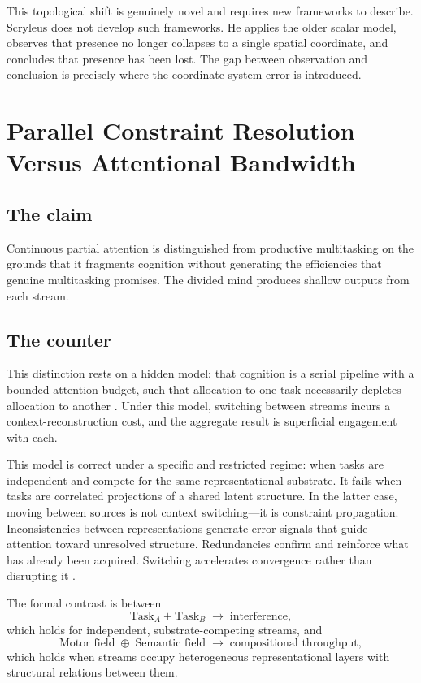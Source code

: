 \documentclass[12pt, a4paper]{article}
\begin{document}
This topological shift is genuinely novel and requires new frameworks to describe. Scryleus does not develop such frameworks. He applies the older scalar model, observes that presence no longer collapses to a single spatial coordinate, and concludes that presence has been lost. The gap between observation and conclusion is precisely where the coordinate-system error is introduced.

\section{Parallel Constraint Resolution Versus Attentional Bandwidth}

\subsection{The claim}
Continuous partial attention is distinguished from productive multitasking on the grounds that it fragments cognition without generating the efficiencies that genuine multitasking promises. The divided mind produces shallow outputs from each stream.

\subsection{The counter}
This distinction rests on a hidden model: that cognition is a serial pipeline with a bounded attention budget, such that allocation to one task necessarily depletes allocation to another \cite{Simon1969}. Under this model, switching between streams incurs a context-reconstruction cost, and the aggregate result is superficial engagement with each.

This model is correct under a specific and restricted regime: when tasks are independent and compete for the same representational substrate. It fails when tasks are correlated projections of a shared latent structure. In the latter case, moving between sources is not context switching---it is constraint propagation. Inconsistencies between representations generate error signals that guide attention toward unresolved structure. Redundancies confirm and reinforce what has already been acquired. Switching accelerates convergence rather than disrupting it \cite{Clark2013}.

The formal contrast is between
\[
\text{Task}_A + \text{Task}_B \;\rightarrow\; \text{interference},
\]
which holds for independent, substrate-competing streams, and
\[
\text{Motor field} \;\oplus\; \text{Semantic field} \;\rightarrow\; \text{compositional throughput},
\]
which holds when streams occupy heterogeneous representational layers with structural relations between them.
\end{document}
